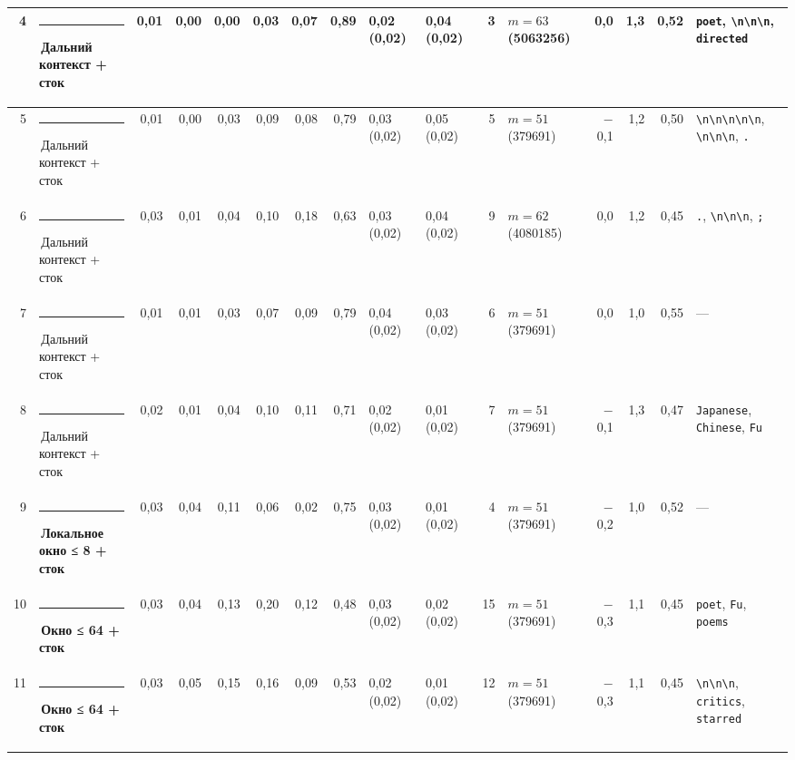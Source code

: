 \documentclass[10pt]{article}
\begin{document}
\begin{minipage}{\linewidth}
\begin{center}
{\begin{tabular}{|r|l|r|r|r|r|r|r|l|l|r|l|r|r|r|l|}
4 & \textcolor[HTML]{C3C2B7}{\rule{0.62em}{0.62em}}\,Дальний контекст + сток & 0,01 & 0,00 & 0,00 & 0,03 & 0,07 & 0,89 & 0,02 (0,02) & 0,04 (0,02) & 3 & $m{=}63$ (5063256) & 0,0 & 1,3 & 0,52 & \texttt{\textvisiblespace{}poet}, \texttt{\textvisiblespace{}\textbackslash{}n\textbackslash{}n\textbackslash{}n}, \texttt{\textvisiblespace{}directed} \\ \hline
5 & \textcolor[HTML]{C3C2B7}{\rule{0.62em}{0.62em}}\,Дальний контекст + сток & 0,01 & 0,00 & 0,03 & 0,09 & 0,08 & 0,79 & 0,03 (0,02) & 0,05 (0,02) & 5 & $m{=}51$ (379691) & $-$0,1 & 1,2 & 0,50 & \texttt{\textvisiblespace{}\textbackslash{}n\textbackslash{}n\textbackslash{}n\textbackslash{}n\textbackslash{}n}, \texttt{\textvisiblespace{}\textbackslash{}n\textbackslash{}n\textbackslash{}n}, \texttt{\textvisiblespace{}.} \\ \hline
6 & \textcolor[HTML]{C3C2B7}{\rule{0.62em}{0.62em}}\,Дальний контекст + сток & 0,03 & 0,01 & 0,04 & 0,10 & 0,18 & 0,63 & 0,03 (0,02) & 0,04 (0,02) & 9 & $m{=}62$ (4080185) & 0,0 & 1,2 & 0,45 & \texttt{\textvisiblespace{}.}, \texttt{\textvisiblespace{}\textbackslash{}n\textbackslash{}n\textbackslash{}n}, \texttt{\textvisiblespace{};} \\ \hline
7 & \textcolor[HTML]{C3C2B7}{\rule{0.62em}{0.62em}}\,Дальний контекст + сток & 0,01 & 0,01 & 0,03 & 0,07 & 0,09 & 0,79 & 0,04 (0,02) & 0,03 (0,02) & 6 & $m{=}51$ (379691) & 0,0 & 1,0 & 0,55 & — \\ \hline
8 & \textcolor[HTML]{C3C2B7}{\rule{0.62em}{0.62em}}\,Дальний контекст + сток & 0,02 & 0,01 & 0,04 & 0,10 & 0,11 & 0,71 & 0,02 (0,02) & 0,01 (0,02) & 7 & $m{=}51$ (379691) & $-$0,1 & 1,3 & 0,47 & \texttt{\textvisiblespace{}Japanese}, \texttt{\textvisiblespace{}Chinese}, \texttt{\textvisiblespace{}Fu} \\ \hline
9 & \textcolor[HTML]{1BAF7A}{\rule{0.62em}{0.62em}}\,\textbf{Локальное окно ≤ 8 + сток} & 0,03 & 0,04 & 0,11 & 0,06 & 0,02 & 0,75 & 0,03 (0,02) & 0,01 (0,02) & 4 & $m{=}51$ (379691) & $-$0,2 & 1,0 & 0,52 & — \\ \hline
10 & \textcolor[HTML]{EDA100}{\rule{0.62em}{0.62em}}\,\textbf{Окно ≤ 64 + сток} & 0,03 & 0,04 & 0,13 & 0,20 & 0,12 & 0,48 & 0,03 (0,02) & 0,02 (0,02) & 15 & $m{=}51$ (379691) & $-$0,3 & 1,1 & 0,45 & \texttt{\textvisiblespace{}poet}, \texttt{\textvisiblespace{}Fu}, \texttt{\textvisiblespace{}poems} \\ \hline
11 & \textcolor[HTML]{EDA100}{\rule{0.62em}{0.62em}}\,\textbf{Окно ≤ 64 + сток} & 0,03 & 0,05 & 0,15 & 0,16 & 0,09 & 0,53 & 0,02 (0,02) & 0,01 (0,02) & 12 & $m{=}51$ (379691) & $-$0,3 & 1,1 & 0,45 & \texttt{\textvisiblespace{}\textbackslash{}n\textbackslash{}n\textbackslash{}n}, \texttt{\textvisiblespace{}critics}, \texttt{\textvisiblespace{}starred} \\ \hline

\end{tabular}}
\end{center}
\end{minipage}
\end{document}
